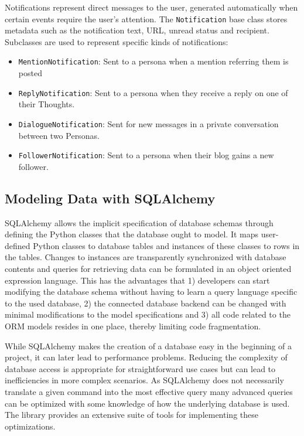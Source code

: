 Notifications represent direct messages to the user, generated
automatically when certain events require the user's attention. The
\texttt{Notification} base class stores metadata such as the
notification text, URL, unread status and recipient. Subclasses are used
to represent specific kinds of notifications:

\begin{itemize}
\tightlist
\item
  \texttt{MentionNotification}: Sent to a persona when a mention
  referring them is posted
\item
  \texttt{ReplyNotification}: Sent to a persona when they receive a
  reply on one of their Thoughts.
\item
  \texttt{DialogueNotification}: Sent for new messages in a private
  conversation between two Personas.
\item
  \texttt{FollowerNotification}: Sent to a persona when their blog gains
  a new follower.
\end{itemize}

\subsection{Modeling Data with
SQLAlchemy}\label{modeling-data-with-sqlalchemy}

SQLAlchemy allows the implicit specification of database schemas through
defining the Python classes that the database ought to model. It maps
user-defined Python classes to database tables and instances of these
classes to rows in the tables. Changes to instances are transparently
synchronized with database contents and queries for retrieving data can
be formulated in an object oriented expression language. This has the
advantages that 1) developers can start modifying the database schema
without having to learn a query language specific to the used database,
2) the connected database backend can be changed with minimal
modifications to the model specifications and 3) all code related to the
ORM models resides in one place, thereby limiting code fragmentation.

While SQLAlchemy makes the creation of a database easy in the beginning
of a project, it can later lead to performance problems. Reducing the
complexity of database access is appropriate for straightforward use
cases but can lead to inefficiencies in more complex scenarios. As
SQLAlchemy does not necessarily translate a given command into the most
effective query many advanced queries can be optimized with some
knowledge of how the underlying database is used. The library provides
an extensive suite of tools for implementing these optimizations.

